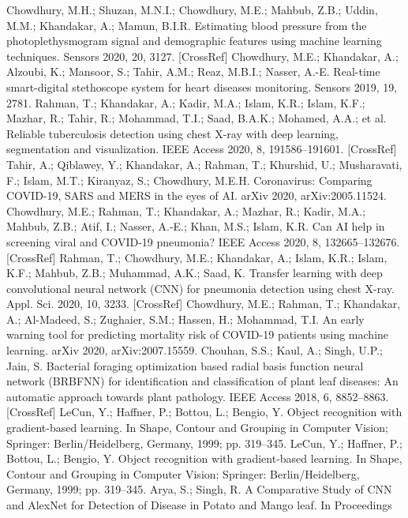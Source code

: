 \documentclass[11pt]{report}
\begin{document}
\begin{thebibliography}{100}
	 Chowdhury, M.H.; Shuzan, M.N.I.; Chowdhury, M.E.; Mahbub, Z.B.; Uddin, M.M.; Khandakar, A.; Mamun, B.I.R. Estimating
	blood pressure from the photoplethysmogram signal and demographic features using machine learning techniques. Sensors 2020,
	20, 3127. [CrossRef]
	 Chowdhury, M.E.; Khandakar, A.; Alzoubi, K.; Mansoor, S.; Tahir, A.M.; Reaz, M.B.I.; Nasser, A.-E. Real-time smart-digital
	stethoscope system for heart diseases monitoring. Sensors 2019, 19, 2781.
	 Rahman, T.; Khandakar, A.; Kadir, M.A.; Islam, K.R.; Islam, K.F.; Mazhar, R.; Tahir, R.; Mohammad, T.I.; Saad, B.A.K.; Mohamed,
	A.A.; et al. Reliable tuberculosis detection using chest X-ray with deep learning, segmentation and visualization. IEEE Access
	2020, 8, 191586–191601. [CrossRef]
	 Tahir, A.; Qiblawey, Y.; Khandakar, A.; Rahman, T.; Khurshid, U.; Musharavati, F.; Islam, M.T.; Kiranyaz, S.; Chowdhury, M.E.H.
	Coronavirus: Comparing COVID-19, SARS and MERS in the eyes of AI. arXiv 2020, arXiv:2005.11524.
	 Chowdhury, M.E.; Rahman, T.; Khandakar, A.; Mazhar, R.; Kadir, M.A.; Mahbub, Z.B.; Atif, I.; Nasser, A.-E.; Khan, M.S.; Islam,
	K.R. Can AI help in screening viral and COVID-19 pneumonia? IEEE Access 2020, 8, 132665–132676. [CrossRef]
	 Rahman, T.; Chowdhury, M.E.; Khandakar, A.; Islam, K.R.; Islam, K.F.; Mahbub, Z.B.; Muhammad, A.K.; Saad, K. Transfer
	learning with deep convolutional neural network (CNN) for pneumonia detection using chest X-ray. Appl. Sci. 2020, 10, 3233.
	[CrossRef]
	 Chowdhury, M.E.; Rahman, T.; Khandakar, A.; Al-Madeed, S.; Zughaier, S.M.; Hassen, H.; Mohammad, T.I. An early warning
	tool for predicting mortality risk of COVID-19 patients using machine learning. arXiv 2020, arXiv:2007.15559.
	 Chouhan, S.S.; Kaul, A.; Singh, U.P.; Jain, S. Bacterial foraging optimization based radial basis function neural network (BRBFNN)
	for identification and classification of plant leaf diseases: An automatic approach towards plant pathology. IEEE Access 2018, 6,
	8852–8863. [CrossRef]
	 LeCun, Y.; Haffner, P.; Bottou, L.; Bengio, Y. Object recognition with gradient-based learning. In Shape, Contour and Grouping in
	Computer Vision; Springer: Berlin/Heidelberg, Germany, 1999; pp. 319–345.
	 LeCun, Y.; Haffner, P.; Bottou, L.; Bengio, Y. Object recognition with gradient-based learning. In Shape, Contour and Grouping in
	Computer Vision; Springer: Berlin/Heidelberg, Germany, 1999; pp. 319–345.
	 Arya, S.; Singh, R. A Comparative Study of CNN and AlexNet for Detection of Disease in Potato and Mango leaf. In Proceedings

\end{thebibliography}
\end{document}
